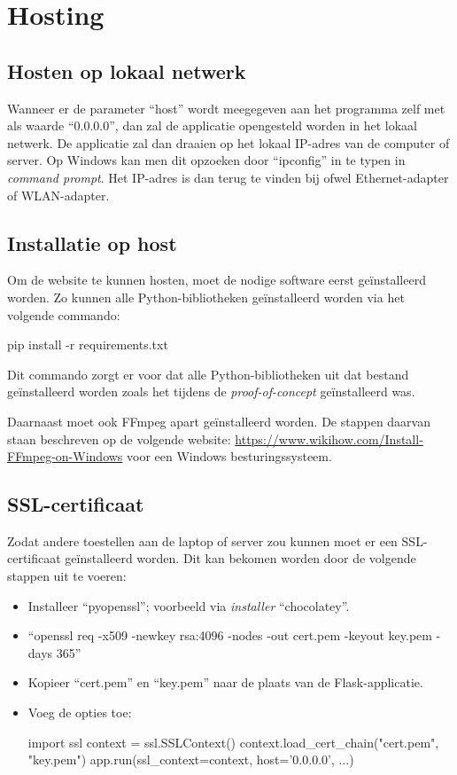 \section{Hosting}
\subsection{Hosten op lokaal netwerk}
Wanneer er de parameter ``host'' wordt meegegeven aan het programma zelf met als waarde ``0.0.0.0'', dan zal de applicatie opengesteld worden in het lokaal netwerk. De applicatie zal dan draaien op het lokaal IP-adres van de computer of server. Op Windows kan men dit opzoeken door ``ipconfig'' in te typen in \textit{command prompt}. Het IP-adres is dan terug te vinden bij ofwel Ethernet-adapter of WLAN-adapter.

\subsection{Installatie op host}
Om de website te kunnen hosten, moet de nodige software eerst geïnstalleerd worden. Zo kunnen alle Python-bibliotheken geïnstalleerd worden via het volgende commando:
\begin{python}
	pip install -r requirements.txt
\end{python}
Dit commando zorgt er voor dat alle Python-bibliotheken uit dat bestand geïnstalleerd worden zoals het tijdens de \textit{proof-of-concept} geïnstalleerd was.

Daarnaast moet ook FFmpeg apart geïnstalleerd worden. De stappen daarvan staan beschreven op de volgende website: \url{https://www.wikihow.com/Install-FFmpeg-on-Windows} voor een Windows besturingssysteem.

\subsection{SSL-certificaat}
Zodat andere toestellen aan de laptop of server zou kunnen moet er een SSL-certificaat geïnstalleerd worden. Dit kan bekomen worden door de volgende stappen uit te voeren:
\begin{itemize}
	\item Installeer ``pyopenssl''; voorbeeld via \textit{installer} ``chocolatey''.
	\item ``openssl req -x509 -newkey rsa:4096 -nodes -out cert.pem -keyout key.pem -days 365''
	\item Kopieer ``cert.pem'' en ``key.pem'' naar de plaats van de Flask-applicatie.
	\item Voeg de opties toe:
	\begin{python}
		import ssl
  		context = ssl.SSLContext()
		context.load_cert_chain("cert.pem", "key.pem")
		app.run(ssl_context=context, host='0.0.0.0', ...)
	\end{python}
\end{itemize}

